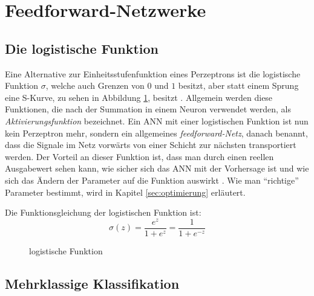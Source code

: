 \documentclass[12pt,titlepage]{article}
\begin{document}
\section{Feedforward-Netzwerke}

\subsection{Die logistische Funktion}

Eine Alternative zur Einheitsstufenfunktion eines Perzeptrons ist die logistische Funktion $\sigma$, welche auch Grenzen von $0$ und $1$ besitzt, aber statt einem Sprung eine S-Kurve, zu sehen in Abbildung \ref{fig:logistic}, besitzt \autocite[17]{abdiNeuralNetworkPrimer1994}. Allgemein werden diese Funktionen, die nach der Summation in einem Neuron verwendet werden, als \textit{Aktivierungsfunktion} bezeichnet. Ein ANN mit einer logistischen Funktion ist nun kein Perzeptron mehr, sondern ein allgemeines \textit{feedforward-Netz}, danach benannt, dass die Signale im Netz vorwärts von einer Schicht zur nächsten transportiert werden. Der Vorteil an dieser Funktion ist, dass man durch einen reellen Ausgabewert sehen kann, wie sicher sich das ANN mit der Vorhersage ist und wie sich das Ändern der Parameter auf die Funktion auswirkt \autocite[Kapitel 1]{nielsenNeuralNetworksDeep2015}. Wie man \enquote{richtige} Parameter bestimmt, wird in Kapitel \ref{sec:optimierung} erläutert.

Die Funktionsgleichung der logistischen Funktion ist:
\[
  \sigma(z) = \frac{e^z}{1 + e^z} = \frac{1}{1 + e^{-z}}
\]

\begin{figure}[H]

  \caption{logistische Funktion}
  \label{fig:logistic}
\end{figure}

\subsection{Mehrklassige Klassifikation}
\end{document}
